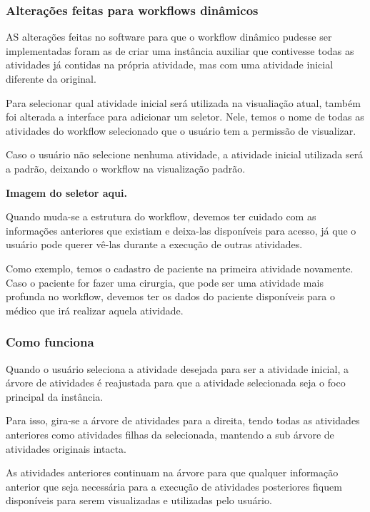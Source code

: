  \subsubsection{Alterações feitas para workflows dinâmicos}

AS alterações feitas no software para que o workflow dinâmico pudesse ser implementadas foram as de criar uma instância auxiliar que contivesse todas as atividades já contidas na própria atividade, mas com uma atividade inicial diferente da original.

Para selecionar qual atividade inicial será utilizada na visualiação atual, também foi alterada a interface para adicionar um seletor. Nele, temos o nome de todas as atividades do workflow selecionado que o usuário tem a permissão de visualizar.

Caso o usuário não selecione nenhuma atividade, a atividade inicial utilizada será a padrão, deixando o workflow na visualização padrão.

\textbf{Imagem do seletor aqui.}

Quando muda-se a estrutura do workflow, devemos ter cuidado com as informações anteriores que existiam e deixa-las disponíveis para acesso, já que o usuário pode querer vê-las durante a execução de outras atividades.

Como exemplo, temos o cadastro de paciente na primeira atividade novamente. Caso o paciente for fazer uma cirurgia, que pode ser uma atividade mais profunda no workflow, devemos ter os dados do paciente disponíveis para o médico que irá realizar aquela atividade.

\subsubsection{Como funciona}

Quando o usuário seleciona a atividade desejada para ser a atividade inicial, a árvore de atividades é reajustada para que a atividade selecionada seja o foco principal da instância.

Para isso, gira-se a árvore de atividades para a direita, tendo todas as atividades anteriores como atividades filhas da selecionada, mantendo a sub árvore de atividades originais intacta.

As atividades anteriores continuam na árvore para que qualquer informação anterior que seja necessária para a execução de atividades posteriores fiquem disponíveis para serem visualizadas e utilizadas pelo usuário.

